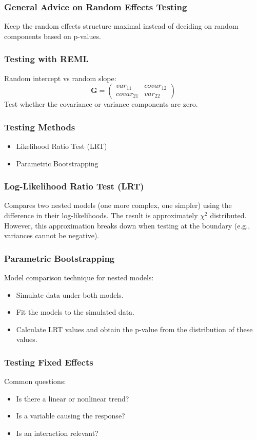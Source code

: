 \documentclass{beamer}
\begin{document}
\begin{frame}
    \frametitle{General Advice on Random Effects Testing}
    Keep the random effects structure maximal instead of deciding on random components based on p-values.
\end{frame}

\begin{frame}
    \frametitle{Testing with REML}
    Random intercept vs random slope:
    \[
    \mathbf{G} = \begin{pmatrix}
    var_{11} & covar_{12} \\
    covar_{21} & var_{22}
    \end{pmatrix}
    \]
    Test whether the covariance or variance components are zero.
\end{frame}

\begin{frame}
    \frametitle{Testing Methods}
    \begin{itemize}
        \item Likelihood Ratio Test (LRT)
        \item Parametric Bootstrapping
    \end{itemize}
\end{frame}

\begin{frame}
    \frametitle{Log-Likelihood Ratio Test (LRT)}
    Compares two nested models (one more complex, one simpler) using the difference in their log-likelihoods. The result is approximately $\chi^2$ distributed. However, this approximation breaks down when testing at the boundary (e.g., variances cannot be negative).
\end{frame}

\begin{frame}
    \frametitle{Parametric Bootstrapping}
    Model comparison technique for nested models:
    \begin{itemize}
        \item Simulate data under both models.
        \item Fit the models to the simulated data.
        \item Calculate LRT values and obtain the p-value from the distribution of these values.
    \end{itemize}
\end{frame}

\begin{frame}
    \frametitle{Testing Fixed Effects}
    Common questions:
    \begin{itemize}
        \item Is there a linear or nonlinear trend?
        \item Is a variable causing the response?
        \item Is an interaction relevant?
    \end{itemize}
\end{frame}
\end{document}
